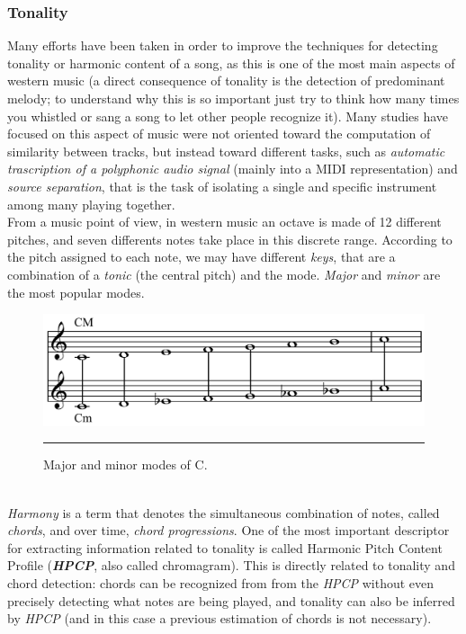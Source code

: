 \subsubsection{Tonality}
Many efforts have been taken in order to improve the techniques for detecting tonality or harmonic content of a song, as this is one of the most main aspects of western music (a direct consequence of tonality is the detection of predominant melody; to understand why this is so important just try to think how many times you whistled or sang a song to let other people recognize it). Many studies have focused on this aspect of music were not oriented toward the computation of similarity between tracks, but instead toward different tasks, such as \textit{automatic trascription of a polyphonic audio signal} (mainly into a MIDI representation) and \textit{source separation}, that is the task of isolating a single and specific instrument among many playing together. \\
From a music point of view, in western music an octave is made of 12 different pitches, and seven differents notes take place in this discrete range. According to the pitch assigned to each note, we may have different \textit{keys}, that are a combination of a \textit{tonic} (the central pitch) and the mode. \textit{Major} and \textit{minor} are the most popular modes. 
\begin{figure}[h]
\begin{center}
\includegraphics[scale=0.15]{Figures/majorminor.png}
    \rule{20em}{0.5pt}
  \caption[Major and minor modes]{Major and minor modes of C.}
  \label{fig:GStreamer}
\end{center}
\end{figure} \\
\textit{Harmony} is a term that denotes the simultaneous combination of notes, called \textit{chords}, and over time, \textit{chord progressions}.  One of the most important descriptor for extracting information related to tonality is called Harmonic Pitch Content Profile (\textbf{\textit{HPCP}}, also called chromagram). This is directly related to tonality and chord detection: chords can be recognized from from the \textit{HPCP} without even precisely detecting what notes are being played, and tonality can also be inferred by \textit{HPCP} (and in this case a previous estimation of chords is not necessary). \\
